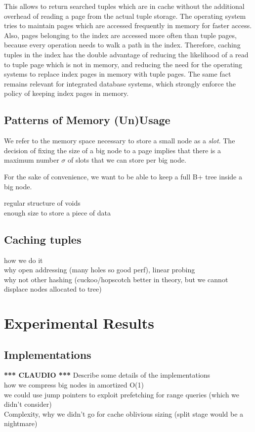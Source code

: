 \documentclass{article}
\newcommand{\claudio}{\textcolor{Cerulean}{\textbf{*** CLAUDIO ***} }}
\begin{document}
This allows to return searched tuples which are in cache without the additional overhead of reading a page from
the actual tuple storage.
The operating system tries to maintain pages which are accessed frequently in memory for faster
access.
Also, pages belonging to the index are accessed more often than tuple pages, because every operation
needs to walk a path in the index.
Therefore, caching tuples in the index has the double advantage of reducing the likelihood
of a read to tuple page which is not in memory, and reducing the need for the operating systems
to replace index pages in memory with tuple pages.
The same fact remains relevant for integrated database systems, which strongly enforce the policy of keeping
index pages in memory.


\subsection{Patterns of Memory (Un)Usage}

We refer to the memory space necessary to store a small node as a \textit{slot}.
The decision of fixing the size of a big node to a page implies that there is a maximum
number $\sigma$ of slots that we can store per big node.

For the sake of convenience, we want to be able to keep a full B+ tree inside a big node.



regular structure of voids \\
enough size to store a piece of data


\subsection{Caching tuples}
how we do it \\
why open addressing (many holes so good perf), linear probing \\
why not other hashing (cuckoo/hopscotch better in theory, but we cannot displace nodes allocated to tree) \\


\section{Experimental Results}

\subsection{Implementations}
\claudio
Describe some details of the implementations \\
how we compress big nodes in amortized O(1)\\
we could use jump pointers to exploit prefetching for range queries (which we didn't consider) \citep{Chen:2001} \\
Complexity, why we didn't go for cache oblivious sizing (split stage would be a nightmare)
\end{document}
